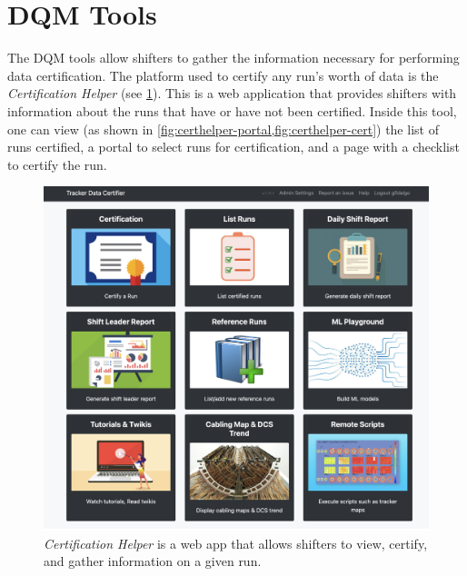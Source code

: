 \section{DQM Tools}
The DQM tools allow shifters to gather the information necessary for performing data certification. The platform used to certify any run's worth of data is the \textit{Certification Helper} (see \cref{fig:certhelper}). This is a web application that provides shifters with information about the runs that have or have not been certified.
Inside this tool, one can view (as shown in \cref{fig:certhelper-portal,fig:certhelper-cert}) the list of runs certified, a portal to select runs for certification, and a page with a checklist to certify the run.

\begin{figure}
	\centering
	\includegraphics[width=.75\linewidth]{Images/certhelper-menu.png}
	\caption{\textit{Certification Helper} is a web app that allows shifters to view, certify, and gather information on a given run.}
	\label{fig:certhelper}
\end{figure}

